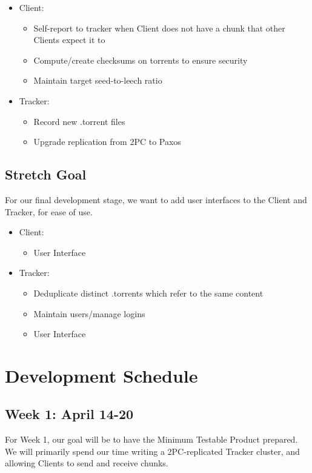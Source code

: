 \documentclass[12pt]{article}
\begin{document}
\begin{itemize}
\item  Client:
    \begin{itemize}
    \item  Self-report to tracker when Client does not have a chunk that other
           Clients expect it to
    \item  Compute/create checksums on torrents to ensure security
    \item  Maintain target seed-to-leech ratio
    \end{itemize}
\item  Tracker:
    \begin{itemize}
    \item  Record new .torrent files
    \item  Upgrade replication from 2PC to Paxos
    \end{itemize}
\end{itemize}

\subsection*{Stretch Goal}
For our final development stage, we want to add user interfaces to the Client
and Tracker, for ease of use.

\begin{itemize}
\item  Client:
    \begin{itemize}
    \item  User Interface
    \end{itemize}
\item  Tracker:
    \begin{itemize}
    \item  Deduplicate distinct .torrents which refer to the same content
    \item  Maintain users/manage logins
    \item  User Interface
    \end{itemize}
\end{itemize}

\section*{Development Schedule}

\subsection*{Week 1: April 14-20}
For Week 1, our goal will be to have the Minimum Testable Product prepared.
We will primarily spend our time writing a 2PC-replicated Tracker cluster,
and allowing Clients to send and receive chunks.
\end{document}
